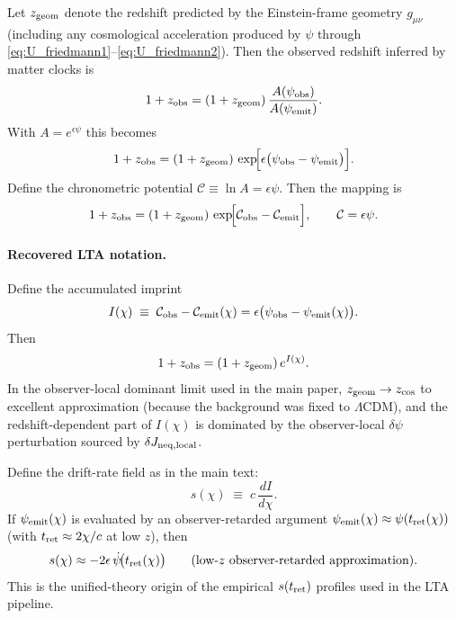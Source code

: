 \documentclass[10pt]{article}
\begin{document}
Let $z_{\rm geom}$ denote the redshift predicted by the Einstein-frame geometry $g_{\mu\nu}$ (including any
cosmological acceleration produced by $\psi$ through \eqref{eq:U_friedmann1}--\eqref{eq:U_friedmann2}).
Then the observed redshift inferred by matter clocks is
\begin{equation}
1+z_{\rm obs}
=
(1+z_{\rm geom})\,\frac{A(\psi_{\rm obs})}{A(\psi_{\rm emit})}.
\label{eq:U_zmap_general}
\end{equation}
With $A=e^{\epsilon\psi}$ this becomes
\begin{equation}
1+z_{\rm obs}
=
(1+z_{\rm geom})\,
\exp\!\Bigl[\epsilon\bigl(\psi_{\rm obs}-\psi_{\rm emit}\bigr)\Bigr].
\label{eq:U_zmap_exp}
\end{equation}
Define the chronometric potential $\mathcal{C}\equiv \ln A = \epsilon\psi$. Then the mapping is
\begin{equation}
1+z_{\rm obs}=(1+z_{\rm geom})\,\exp\!\Bigl[\mathcal{C}_{\rm obs}-\mathcal{C}_{\rm emit}\Bigr],
\qquad
\mathcal{C}=\epsilon\psi.
\label{eq:U_zmap_C}
\end{equation}

\paragraph{Recovered LTA notation.}
Define the accumulated imprint
\begin{equation}
I(\chi)\;\equiv\;\mathcal{C}_{\rm obs}-\mathcal{C}_{\rm emit}(\chi)
=\epsilon\bigl(\psi_{\rm obs}-\psi_{\rm emit}(\chi)\bigr).
\label{eq:U_I_def}
\end{equation}
Then
\begin{equation}
1+z_{\rm obs}=(1+z_{\rm geom})\,e^{I(\chi)}.
\label{eq:U_lta_form}
\end{equation}
In the observer-local dominant limit used in the main paper, $z_{\rm geom}\rightarrow z_{\rm cos}$ to excellent approximation
(because the background was fixed to $\Lambda$CDM), and the redshift-dependent part of $I(\chi)$ is dominated by the observer-local
$\delta\psi$ perturbation sourced by $\delta J_{\rm neq,local}$.

Define the drift-rate field as in the main text:
\begin{equation}
s(\chi)\;\equiv\;c\,\frac{dI}{d\chi}.
\label{eq:U_s_def}
\end{equation}
If $\psi_{\rm emit}(\chi)$ is evaluated by an observer-retarded argument $\psi_{\rm emit}(\chi)\approx \psi(t_{\rm ret}(\chi))$
(with $t_{\rm ret}\approx 2\chi/c$ at low $z$), then
\begin{equation}
s(\chi)\approx -2\epsilon\,\dot\psi\!\bigl(t_{\rm ret}(\chi)\bigr)
\qquad (\text{low-$z$ observer-retarded approximation}).
\label{eq:U_s_retarded}
\end{equation}
This is the unified-theory origin of the empirical $s(t_{\rm ret})$ profiles used in the LTA pipeline.
\end{document}
